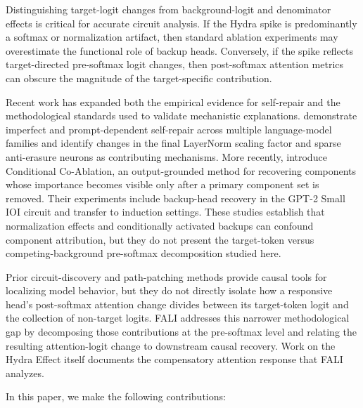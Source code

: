 \documentclass[10pt]{article} %
\begin{document}
Distinguishing target-logit changes from background-logit and denominator effects is critical for accurate circuit analysis. If the Hydra spike is predominantly a softmax or normalization artifact, then standard ablation experiments may overestimate the functional role of backup heads. Conversely, if the spike reflects target-directed pre-softmax logit changes, then post-softmax attention metrics can obscure the magnitude of the target-specific contribution.

Recent work has expanded both the empirical evidence for self-repair and the
methodological standards used to validate mechanistic explanations.
\citet{rushing2024selfrepair} demonstrate imperfect and prompt-dependent
self-repair across multiple language-model families and identify changes in
the final LayerNorm scaling factor and sparse anti-erasure neurons as
contributing mechanisms. More recently, \citet{gong2026conditional} introduce
Conditional Co-Ablation, an output-grounded method for recovering components
whose importance becomes visible only after a primary component set is
removed. Their experiments include backup-head recovery in the GPT-2 Small
IOI circuit and transfer to induction settings. These studies establish that
normalization effects and conditionally activated backups can confound
component attribution, but they do not present the target-token versus
competing-background pre-softmax decomposition studied here.

Prior circuit-discovery and path-patching methods
\citep{conmy2023automated,goldowsky2023localizing} provide causal tools for
localizing model behavior, but they do not directly isolate how a responsive
head's post-softmax attention change divides between its target-token logit and
the collection of non-target logits. FALI addresses this narrower
methodological gap by decomposing those contributions at the pre-softmax level
and relating the resulting attention-logit change to downstream causal
recovery. Work on the Hydra Effect itself \citep{mcgrath2023hydra} documents
the compensatory attention response that FALI analyzes.

In this paper, we make the following contributions:
\end{document}
